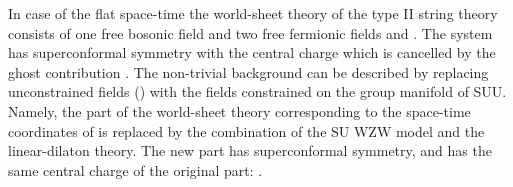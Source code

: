 \documentclass[a4paper,prd,preprint]{revtex4}
\begin{document}
In case of the flat space-time
 the world-sheet theory of the type II string theory
 consists of one free bosonic field \coordHE{}
 and two free fermionic fields
 \coordHE{} and \coordHE{}.
The system has \coordHE{} superconformal symmetry
 with the central charge \coordHE{}
 which is cancelled by the ghost contribution
 \coordHE{}.
The non-trivial background \coordHE{}
 can be described by replacing unconstrained fields
 \coordHE{} (\coordHE{})
 with the fields constrained on the group manifold of
 SU\coordHE{}U\coordHE{}.
Namely,
 the part of the world-sheet theory
 corresponding to the space-time coordinates of \coordHE{}
 is replaced by the combination of the SU\coordHE{} WZW model
 and the linear-dilaton theory.
The new part has \coordHE{} superconformal symmetry,
 and has the same central charge of the original part:
 \coordHE{}.
\end{document}
